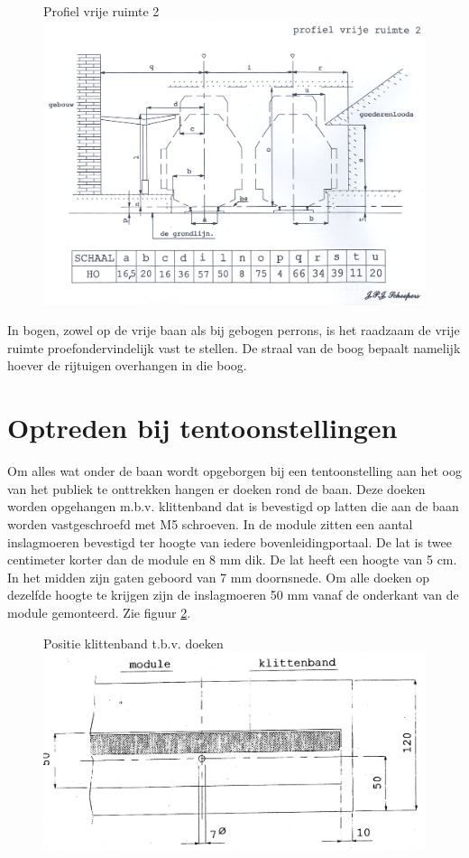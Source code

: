 \documentclass[12pt,a4paper]{report}
\begin{document}
\begin{figure}[ht]
  \captionbox
  {Profiel vrije ruimte 2\label{figuur16}}
  {\includegraphics[scale=0.6]{images/rcu_figuur16}}
\end{figure}

In bogen, zowel op de vrije baan als bij gebogen perrons, is het raadzaam de vrije ruimte proefondervindelijk vast te stellen. De straal van de boog bepaalt namelijk hoever de rijtuigen overhangen in die boog.

\section{Optreden bij tentoonstellingen}

Om alles wat onder de baan wordt opgeborgen bij een tentoonstelling aan het oog van het publiek te onttrekken hangen er doeken rond de baan. Deze doeken worden opgehangen m.b.v. klittenband dat is bevestigd op latten die aan de baan worden vastgeschroefd met M5 schroeven. In de module zitten een aantal inslagmoeren bevestigd ter hoogte van iedere bovenleidingportaal. De lat is twee centimeter korter dan de module en 8 mm dik. De lat heeft een hoogte van 5 cm. In het midden zijn gaten geboord van 7 mm doornsnede. Om alle doeken op dezelfde hoogte te krijgen zijn de inslagmoeren 50 mm vanaf de onderkant van de module gemonteerd. Zie figuur \ref{figuur17}.

\begin{figure}[ht]
  \captionbox
  {Positie klittenband t.b.v. doeken\label{figuur17}}
  {\includegraphics[scale=0.4]{images/rcu_figuur17}}
\end{figure}
\end{document}
